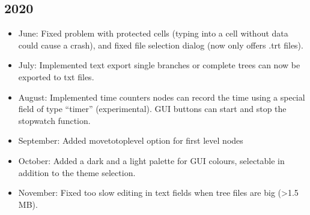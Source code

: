 \documentclass[letterpaper,10pt,english]{sphinxmanual}
\begin{document}
\subsection{2020}
\label{\detokenize{releases:id6}}\begin{itemize}
\item {} 
\sphinxAtStartPar
June: Fixed problem with protected cells (typing into a cell without data could cause a crash), and fixed file selection dialog (now only offers .trt files).

\item {} 
\sphinxAtStartPar
July: Implemented text export \sphinxhyphen{} single branches or complete trees can now be exported to txt files.

\item {} 
\sphinxAtStartPar
August: Implemented time counters \sphinxhyphen{} nodes can record the time using a special field of type “timer” (experimental). GUI buttons can start and stop the stopwatch function.

\item {} 
\sphinxAtStartPar
September: Added move\sphinxhyphen{}to\sphinxhyphen{}top\sphinxhyphen{}level option for first level nodes

\item {} 
\sphinxAtStartPar
October: Added a dark and a light palette for GUI colours, selectable in addition to the theme selection.

\item {} 
\sphinxAtStartPar
November: Fixed too slow editing in text fields when tree files are big (\textgreater{}1.5 MB).

\end{itemize}
\end{document}
